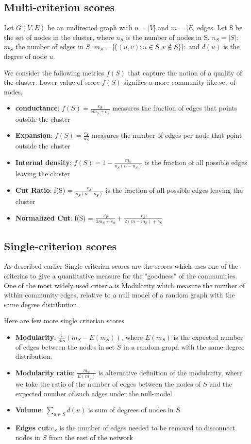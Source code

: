 \documentclass[letterpaper]{article}
\begin{document}
\subsection{Multi-criterion scores}
Let $G(V,E)$ be an undirected graph with $n=|V|$ and $m=|E|$ edges. Let S be the set of nodes in the cluster, where $n_S$ is the number of nodes in S,
$n_S=|S|$; $m_S$ the number of edges in $S$,  $m_S=|\{(u,v):u\in S, v\notin S\}|;$ and $d(u)$ is the degree of node $u$.

We consider the following metrics $f(S)$ that capture the notion of a quality of the cluster. Lower value of score $f(S)$ signifies a more community-like set of 
nodes.
\begin{itemize}
\item \textbf{conductance}: $f(S) = \frac{c_S}{c m_S+c_S}$ measures the fraction of edges that points outside the
cluster
\item \textbf{Expansion}: $f(S) = \frac{c_S}{n_S}$ measures the number of edges per node that point outside the
cluster
\item \textbf{Internal density}: $f(S) = 1 - \frac{m_S}{n_S(n-n_S)}$ is the fraction of all possible edges leaving
the cluster
\item \textbf{Cut Ratio}: f(S) = $\frac{c_S}{n_S(n-n_S)}$ is the fraction of all possible edges leaving the cluster 
\item \textbf{Normalized Cut}:  f(S) = $\frac{c_S}{2m_S+c_S} + \frac{c_S}{2(m-m_S)+c_S}$
\end{itemize}

\subsection{Single-criterion scores}
As described earlier Single criterian scores are the scores which uses one of
the criterias to give a quantitative measure for the "goodness" of the
communities. One of the most widely used criteria is Modularity
\cite{newmod2006} which measure the number of within community edges, relative
to a null model of a random graph with the same degree distribution.

Here are few more single criterian scores
\begin{itemize}
\item \textbf{Modularity}: $\frac{1}{4m}(m_S-E(m_S))$, where $E(m_S)$ is the expected number of edges between
the nodes in set $S$ in a random graph with the same degree distribution.
\item \textbf{Modularity ratio}: $\frac{m_S}{E(m_S)}$ is alternative definition of the modularity, where we take 
the ratio of the number of edges between the nodes of $S$ and the expected number of such edges under the
null-model
\item \textbf{Volume}: $\sum_{u\in S}d(u)$ is sum of degrees of nodes in $S$
\item \textbf{Edges cut}:$c_S$ is the number of edges needed to be removed to disconnect nodes in $S$ from the 
rest of the network
\end{itemize}
\end{document}
